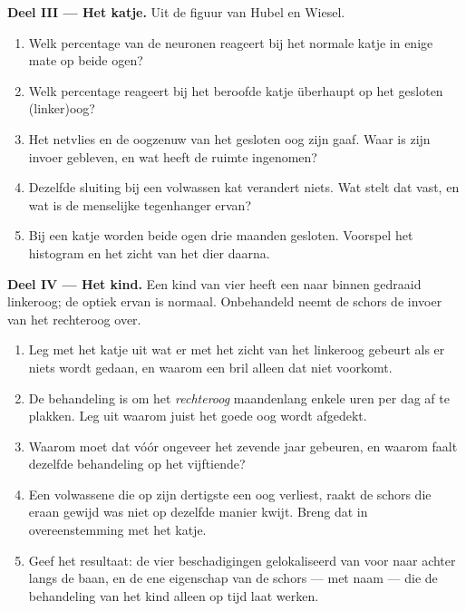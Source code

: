 \begin{problem}
\medskip
\noindent\textbf{Deel III --- Het katje.}
Uit de figuur van Hubel en Wiesel.
\begin{enumerate}[resume]
  \item Welk percentage van de neuronen reageert bij het normale katje in
        enige mate op beide ogen?
  \item Welk percentage reageert bij het beroofde katje überhaupt op het
        gesloten (linker)oog?
  \item Het netvlies en de oogzenuw van het gesloten oog zijn gaaf. Waar
        is zijn invoer gebleven, en wat heeft de ruimte ingenomen?
  \item Dezelfde sluiting bij een volwassen kat verandert niets. Wat
        stelt dat vast, en wat is de menselijke tegenhanger ervan?
  \item Bij een katje worden beide ogen drie maanden gesloten. Voorspel
        het histogram en het zicht van het dier daarna.
\end{enumerate}

\medskip
\noindent\textbf{Deel IV --- Het kind.}
Een kind van vier heeft een naar binnen gedraaid linkeroog; de optiek
ervan is normaal. Onbehandeld neemt de schors de invoer van het
rechteroog over.
\begin{enumerate}[resume]
  \item Leg met het katje uit wat er met het zicht van het linkeroog
        gebeurt als er niets wordt gedaan, en waarom een bril alleen dat
        niet voorkomt.
  \item De behandeling is om het \emph{rechteroog} maandenlang enkele
        uren per dag af te plakken. Leg uit waarom juist het goede oog
        wordt afgedekt.
  \item Waarom moet dat vóór ongeveer het zevende jaar gebeuren, en
        waarom faalt dezelfde behandeling op het vijftiende?
  \item Een volwassene die op zijn dertigste een oog verliest, raakt de
        schors die eraan gewijd was niet op dezelfde manier kwijt. Breng
        dat in overeenstemming met het katje.
  \item Geef het resultaat: de vier beschadigingen gelokaliseerd van voor
        naar achter langs de baan, en de ene eigenschap van de schors ---
        met naam --- die de behandeling van het kind alleen op tijd laat
        werken.
\end{enumerate}
\end{problem}
